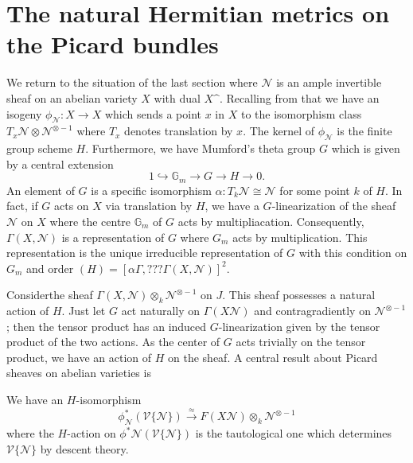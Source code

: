 \section{The natural Hermitian metrics on the Picard
bundles}\label{chap8-sec3}

We return to the situation of the last section where $\mathscr{N}$ is
an ample invertible sheaf on an abelian variety $X$ with dual
$X\sphat$. Recalling from \cite{chap8-key5} that we have an isogeny
$\phi_{\mathscr{N}}:X\to X$ which sends a point $x$ in $X$ to the
isomorphism class $T_{x}\mathscr{N}\otimes \mathscr{N}^{\otimes -1}$
where $T_{x}$ denotes translation by $x$. The kernel of
$\phi_{\mathscr{N}}$ is the finite group scheme $H$. Furthermore, we
have Mumford's theta group $G$ which is given by a central extension
$$
1\hookrightarrow \mathbb{G}_{m}\to G\to H\to 0.
$$
An element of $G$ is a specific isomorphism
$\alpha:T_{k}\mathscr{N}\cong \mathscr{N}$ for some point $k$ of
$H$. In fact, if $G$ acts on $X$ via translation by $H$, we have a
$G$-linearization of the sheaf $\mathscr{N}$ on $X$ where the centre
$\mathbb{G}_{m}$ of $G$ acts by multipliacation. Consequently,
$\Gamma(X,\mathscr{N})$ is a representation of $G$ where $G_{m}$ acts
by multiplication. This representation is the unique irreducible
representation of $G$ with this condition on $G_{m}$ and order
$(H)=[\alpha\Gamma,??? \Gamma(X,\mathscr{N})]^{2}$. 

Consider\pageoriginale the sheaf
$\Gamma(X,\mathscr{N})\otimes_{k}\mathscr{N}^{\otimes-1}$ on $J$. This
sheaf possesses a natural action of $H$. Just let $G$ act naturally on
$\Gamma(X\mathscr{N})$ and contragradiently on $\mathscr{N}^{\otimes
-1}$; then the tensor product has an induced $G$-linearization given
by the tensor product of the two actions. As the center of $G$ acts
trivially on the tensor product, we have an action of $H$ on the
sheaf. A central result about Picard sheaves on abelian varieties is

\begin{proposition}\label{chap8-prop3}
We have an $H$-isomorphism
$$
\phi^{*}_{\mathscr{N}}(\mathscr{V}\{\mathscr{N}\})\xrightarrow{\approx}F(X\mathscr{N})\otimes_{k}\mathscr{N}^{\otimes -1}
$$
where the $H$-action on
$\phi^{*}\mathscr{N}(\mathscr{V}\{\mathscr{N}\})$ is the tautological
one which determines $\mathscr{V}\{\mathscr{N}\}$ by descent theory.
\end{proposition}

